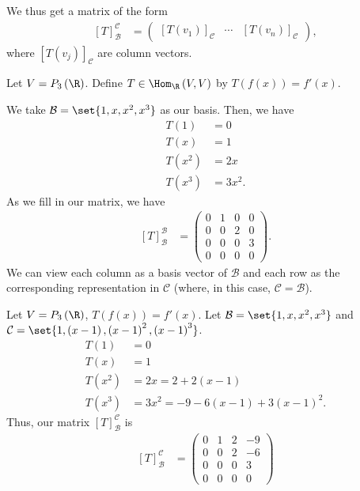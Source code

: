 \documentclass[10pt]{mypackage}
\begin{document}
  We thus get a matrix of the form
  \begin{align*}
    \left[T\right]_{\mathcal{B}}^{\mathcal{C}} &= \begin{pmatrix}\left[T\left(v_1\right)\right]_{\mathcal{C}} & \cdots & \left[T\left(v_n\right)\right]_{\mathcal{C}}\end{pmatrix},
  \end{align*}
  where $\left[T\left(v_j\right)\right]_{\mathcal{C}}$ are column vectors.
\begin{example}
  Let $V = P_{3}\left(\R\right)$. Define $T\in \Hom_{\R}\left(V,V\right)$ by $T\left(f(x)\right) = f'(x)$.\newline

  We take $\mathcal{B} = \set{1,x,x^2,x^3}$ as our basis. Then, we have
  \begin{align*}
    T\left(1\right) &= 0\\
    T\left(x\right) &= 1\\
    T\left(x^2\right) &= 2x\\
    T\left(x^3\right) &= 3x^2.
  \end{align*}
  As we fill in our matrix, we have
  \begin{align*}
    \left[T\right]_{\mathcal{B}}^{\mathcal{B}} &= \begin{pmatrix}0 & 1 & 0 & 0\\  0 & 0 & 2 & 0\\ 0 & 0 & 0 & 3 \\ 0 & 0 & 0 & 0 \end{pmatrix}.
  \end{align*}
  We can view each column as a basis vector of $\mathcal{B}$ and each row as the corresponding representation in $\mathcal{C}$ (where, in this case, $\mathcal{C} = \mathcal{B}$).
\end{example}
\begin{example}
  Let $V = P_{3}\left(\R\right)$, $T\left(f(x)\right) = f'(x)$. Let $\mathcal{B} = \set{1,x,x^2,x^3}$ and $\mathcal{C} = \set{1,\left(x-1\right),\left(x-1\right)^2,\left(x-1\right)^3}$.
  \begin{align*}
    T\left(1\right) &= 0\\
    T\left(x\right) &= 1\\
    T\left(x^2\right) &= 2x = 2 + 2\left(x-1\right)\\
    T\left(x^3\right) &= 3x^2 = -9 - 6\left(x-1\right) + 3\left(x-1\right)^2.
  \end{align*}
  Thus, our matrix $\left[T\right]_{\mathcal{B}}^{\mathcal{C}}$ is
  \begin{align*}
    \left[T\right]_{\mathcal{B}}^{\mathcal{C}} &= \begin{pmatrix}0 & 1 & 2 & -9 \\ 0 & 0 & 2 & -6\\ 0&0&0&3\\ 0&0&0&0\end{pmatrix}
  \end{align*}
\end{example}
\end{document}
